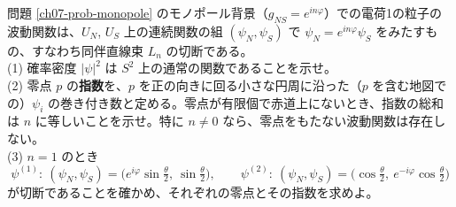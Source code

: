 \begin{problem}[難易度 B]\label{ch07-prob-section}
問題 \ref{ch07-prob-monopole} のモノポール背景（$g_{NS}=e^{in\varphi}$）での電荷1の粒子の波動関数は、$U_N$, $U_S$ 上の連続関数の組 $(\psi_N,\psi_S)$ で $\psi_N=e^{in\varphi}\psi_S$ をみたすもの、すなわち同伴直線束 $L_n$ の切断である。\\
(1) 確率密度 $\lvert\psi\rvert^2$ は $S^2$ 上の通常の関数であることを示せ。\\
(2) 零点 $p$ の\textbf{指数}を、$p$ を正の向きに回る小さな円周に沿った（$p$ を含む地図での）$\psi_i$ の巻き付き数と定める。零点が有限個で赤道上にないとき、指数の総和は $n$ に等しいことを示せ。特に $n\neq0$ なら、零点をもたない波動関数は存在しない。\\
(3) $n=1$ のとき
\[
\psi^{(1)}:\ (\psi_N,\psi_S)=\bigl(e^{i\varphi}\sin\tfrac\theta2,\ \sin\tfrac\theta2\bigr),\qquad \psi^{(2)}:\ (\psi_N,\psi_S)=\bigl(\cos\tfrac\theta2,\ e^{-i\varphi}\cos\tfrac\theta2\bigr)
\]
が切断であることを確かめ、それぞれの零点とその指数を求めよ。
\end{problem}


